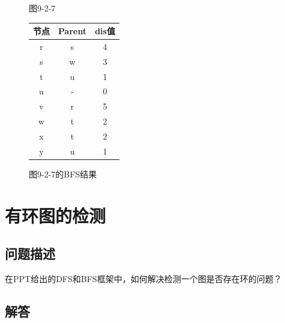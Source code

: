 \documentclass{article}
\begin{document}
\begin{enumerate}
\begin{figure}[htbp]
\begin{minipage}[b]{0.6\textwidth}
                \caption{图9-2-7}
                \label{fig:9-2-7}
        \end{minipage}%
        \hfill%
        \begin{minipage}[b]{0.4\textwidth}    %
            \centering
            \begin{tabular}{|c|c|c|}
                    \hline
                    节点 & Parent & dis值 \\
                    \hline
                    r & s & 4 \\
                    s & w & 3 \\
                    t & u & 1 \\
                    u & - & 0 \\
                    v & r & 5 \\
                    w & t & 2 \\
                    x & t & 2 \\
                    y & u & 1 \\
                    \hline
                \end{tabular}
                \caption{图9-2-7的BFS结果}
                \label{tab:graph9-2-7-bfs}
        \end{minipage}
    \end{figure}
\end{enumerate}


\pagebreak

\section{有环图的检测}
\subsection{问题描述}

在PPT给出的DFS和BFS框架中，如何解决检测一个图是否存在环的问题？


\subsection{解答}
\end{document}
